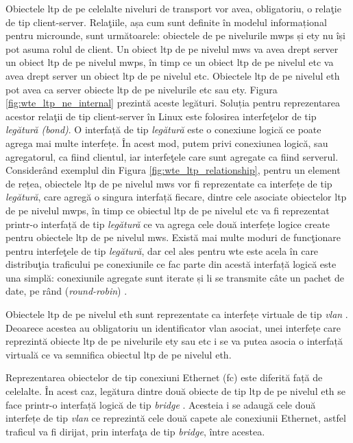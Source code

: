 Obiectele \gls{ltp} de pe celelalte niveluri de transport vor avea, obligatoriu, o relaţie de tip client-server. Relaţiile, așa cum sunt definite în modelul informațional pentru microunde, sunt următoarele: obiectele de pe nivelurile \gls{mwps} și \gls{ety} nu își pot asuma rolul de client. Un obiect \gls{ltp} de pe nivelul \gls{mws} va avea drept server un obiect \gls{ltp} de pe nivelul \gls{mwps}, în timp ce un obiect \gls{ltp} de pe nivelul \gls{etc} va avea drept server un obiect \gls{ltp} de pe nivelul \gls{etc}. Obiectele \gls{ltp} de pe nivelul \gls{eth} pot avea ca server obiecte \gls{ltp} de pe nivelurile \gls{etc} sau \gls{ety}. Figura \ref{fig:wte_ltp_ne_internal} prezintă aceste legături. Soluția pentru reprezentarea acestor relaţii de tip client-server în Linux este folosirea interfeţelor de tip \textit{legătură (bond)}. O interfață de tip \textit{legătură} este o conexiune logică ce poate agrega mai multe interfețe. În acest mod, putem privi conexiunea logică, sau agregatorul, ca fiind clientul, iar interfeţele care sunt agregate ca fiind serverul. Considerând exemplul din Figura \ref{fig:wte_ltp_relationship}, pentru un element de rețea, obiectele \gls{ltp} de pe nivelul \gls{mws} vor fi reprezentate ca interfețe de tip \textit{legătură}, care agregă o singura interfață fiecare, dintre cele asociate obiectelor \gls{ltp} de pe nivelul \gls{mwps}, în timp ce obiectul \gls{ltp} de pe nivelul \gls{etc} va fi reprezentat printr-o interfață de tip \textit{legătură} ce va agrega cele două interfețe logice create pentru obiectele \gls{ltp} de pe nivelul \gls{mws}. Există mai multe moduri de funcţionare pentru interfeţele de tip \textit{legătură}, dar cel ales pentru \gls{wte} este acela în care distribuţia traficului pe conexiunile ce fac parte din acestă interfață logică este una simplă: conexiunile agregate sunt iterate și li se transmite câte un pachet de date, pe rând (\textit{round-robin}) \cite{hahne1991round}.

Obiectele \gls{ltp} de pe nivelul \gls{eth} sunt reprezentate ca interfețe virtuale de tip \textit{vlan} \cite{iplinkmanpage}. Deoarece acestea au obligatoriu un identificator \gls{vlan} asociat, unei interfețe care reprezintă obiecte \gls{ltp} de pe nivelurile \gls{ety} sau \gls{etc} i se va putea asocia o interfață virtuală ce va semnifica obiectul \gls{ltp} de pe nivelul \gls{eth}.

Reprezentarea obiectelor de tip conexiuni Ethernet (\gls{fc}) este diferită față de celelalte. În acest caz, legătura dintre două obiecte de tip \gls{ltp} de pe nivelul \gls{eth} se face printr-o interfață logică de tip \textit{bridge} \cite{iplinkmanpage}. Acesteia i se adaugă cele două interfețe de tip \textit{vlan} ce reprezintă cele două capete ale conexiunii Ethernet, astfel traficul va fi dirijat, prin interfaţa de tip \textit{bridge}, între acestea.

